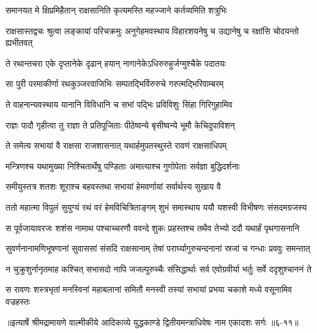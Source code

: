 \twolineshloka
{समानयत मे क्षिप्रमिहैतान् राक्षसानिति}
{कृत्यमस्ति महज्जाने कर्तव्यमिति शत्रुभिः} %

\threelineshloka
{राक्षसास्तद्वचः श्रुत्वा लङ्कायां परिचक्रमुः}
{अनुगेहमवस्थाय विहारशयनेषु च}
{उद्यानेषु च रक्षांसि चोदयन्तो ह्यभीतवत्} %

\twolineshloka
{ते रथान्तचरा एके दृप्तानेके दृढान् हयान्}
{नागानेकेऽधिरुरुहुर्जग्मुश्चैके पदातयः} %

\twolineshloka
{सा पुरी परमाकीर्णा रथकुञ्जरवाजिभिः}
{सम्पतद्भिर्विरुरुचे गरुत्मद्भिरिवाम्बरम्} %

\twolineshloka
{ते वाहनान्यवस्थाय यानानि विविधानि च}
{सभां पद्भिः प्रविविशुः सिंहा गिरिगुहामिव} %

\twolineshloka
{राज्ञः पादौ गृहीत्वा तु राज्ञा ते प्रतिपूजिताः}
{पीठेष्वन्ये बृसीष्वन्ये भूमौ केचिदुपाविशन्} %

\twolineshloka
{ते समेत्य सभायां वै राक्षसा राजशासनात्}
{यथार्हमुपतस्थुस्ते रावणं राक्षसाधिपम्} %

\twolineshloka
{मन्त्रिणश्च यथामुख्या निश्चितार्थेषु पण्डिताः}
{अमात्याश्च गुणोपेताः सर्वज्ञा बुद्धिदर्शनाः} %

\twolineshloka
{समीयुस्तत्र शतशः शूराश्च बहवस्तथा}
{सभायां हेमवर्णायां सर्वार्थस्य सुखाय वै} %

\twolineshloka
{ततो महात्मा विपुलं सुयुग्यं रथं वरं हेमविचित्रिताङ्गम्}
{शुभं समास्थाय ययौ यशस्वी विभीषणः संसदमग्रजस्य} %

\twolineshloka
{स पूर्वजायावरजः शशंस नामाथ पश्चाच्चरणौ ववन्दे}
{शुकः प्रहस्तश्च तथैव तेभ्यो ददौ यथार्हं पृथगासनानि} %

\twolineshloka
{सुवर्णनानामणिभूषणानां सुवाससां संसदि राक्षसानाम्}
{तेषां परार्घ्यागुरुचन्दनानां स्रजां च गन्धाः प्रववुः समन्तात्} %

\twolineshloka
{न चुक्रुशुर्नानृतमाह कश्चित् सभासदो नापि जजल्पुरुच्चैः}
{संसिद्धार्थाः सर्व एवोग्रवीर्या भर्तुः सर्वे ददृशुश्चाननं ते} %

\twolineshloka
{स रावणः शस्त्रभृतां मनस्विनां महाबलानां समितौ मनस्वी}
{तस्यां सभायां प्रभया चकाशे मध्ये वसूनामिव वज्रहस्तः} %


॥इत्यार्षे श्रीमद्रामायणे वाल्मीकीये आदिकाव्ये युद्धकाण्डे द्वितीयमन्त्राधिवेषः नाम एकादशः सर्गः ॥६-११॥
